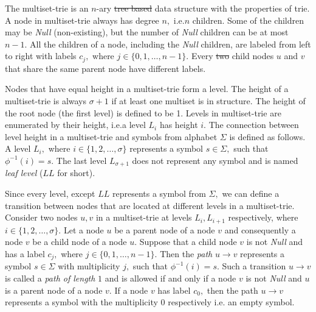 \documentclass[10pt,letterpaper]{article}
\providecommand{\DIFaddtex}[1]{{\protect\color{blue}\uwave{#1}}} %
\providecommand{\DIFdeltex}[1]{{\protect\color{red}\sout{#1}}}                      %
\providecommand{\DIFaddbegin}{} %
\providecommand{\DIFaddend}{} %
\providecommand{\DIFdelbegin}{} %
\providecommand{\DIFdelend}{} %
\providecommand{\DIFadd}[1]{\texorpdfstring{\DIFaddtex{#1}}{#1}} %
\providecommand{\DIFdel}[1]{\texorpdfstring{\DIFdeltex{#1}}{}} %
\newcommand{\DIFscaledelfig}{0.5}
\newlength{\DIFdelgraphicswidth} %
\newlength{\DIFdelgraphicsheight} %
\newcommand{\DIFaddincludegraphics}[2][]{{\color{blue}\fbox{\DIFOincludegraphics[#1]{#2}}}} %
\newcommand{\DIFdelincludegraphics}[2][]{%
\sbox{\DIFdelgraphicsbox}{\DIFOincludegraphics[#1]{#2}}%
\settoboxwidth{\DIFdelgraphicswidth}{\DIFdelgraphicsbox} %
\settoboxtotalheight{\DIFdelgraphicsheight}{\DIFdelgraphicsbox} %
\scalebox{\DIFscaledelfig}{%
\parbox[b]{\DIFdelgraphicswidth}{\usebox{\DIFdelgraphicsbox}\\[-\baselineskip] \rule{\DIFdelgraphicswidth}{0em}}\llap{\resizebox{\DIFdelgraphicswidth}{\DIFdelgraphicsheight}{%
\setlength{\unitlength}{\DIFdelgraphicswidth}%
\begin{picture}(1,1)%
\thicklines\linethickness{2pt} %
{\color[rgb]{1,0,0}\put(0,0){\framebox(1,1){}}}%
{\color[rgb]{1,0,0}\put(0,0){\line( 1,1){1}}}%
{\color[rgb]{1,0,0}\put(0,1){\line(1,-1){1}}}%
\end{picture}%
}\hspace*{3pt}}} %
} %
\DeclareRobustCommand{\DIFaddbegin}{\DIFOaddbegin \let\includegraphics\DIFaddincludegraphics} %
\DeclareRobustCommand{\DIFaddend}{\DIFOaddend \let\includegraphics\DIFOincludegraphics} %
\DeclareRobustCommand{\DIFdelbegin}{\DIFOdelbegin \let\includegraphics\DIFdelincludegraphics} %
\DeclareRobustCommand{\DIFdelend}{\DIFOaddend \let\includegraphics\DIFOincludegraphics} %
\begin{document}
The multiset-trie is an $n$-ary \DIFdelbegin \DIFdel{tree based }\DIFdelend \DIFaddbegin \DIFadd{tree-based }\DIFaddend data structure with the properties of 
\DIFaddbegin \DIFadd{the }\DIFaddend trie. A node in multiset-trie always has degree $n,$ i.e.\DIFaddbegin \DIFadd{, }\DIFaddend $n$ children. Some of 
the children may be \emph{Null} (non-existing), but the number of \emph{Null} 
children can be at most $n-1.$ All the children of a node, including the \emph{Null} 
children, are labeled from left to right with labels $c_j,$ where $j\in \{ 0, 1, \ldots, n-1 \}.$ 
Every \DIFdelbegin \DIFdel{two }\DIFdelend \DIFaddbegin \DIFadd{pair of }\DIFaddend child nodes $u$ and $v$ that share the same parent node have different labels.


Nodes that have equal height in a multiset-trie form a level. The height of a 
multiset-trie is always $\sigma+1$ if at least one multiset is in structure. 
The height of the root node (the first level) is defined to be 1.
%
Levels in multiset-trie are enumerated by their height, i.e.\DIFaddbegin \DIFadd{, }\DIFaddend a level $L_i$ has 
height $i.$ The connection between level height in a multiset-trie and symbols 
from alphabet $\Sigma$ is defined as follows. A level $L_i,$ where 
$i\in\{ 1,2,\ldots, \sigma \}$ represents a symbol $s\in\Sigma,$ such that 
$\phi^{-1}(i) = s.$ The last level $L_{\sigma+1}$ does not represent any symbol 
and is named \emph{leaf level} ($LL$ for short).

Since every level, except $LL$ represents a symbol from $\Sigma,$ we can define 
a transition between nodes that are located at different levels in a multiset-trie. 
%
Consider two nodes $u,v$ in a multiset-trie at levels $L_i, L_{i+1}$ respectively, 
where $i\in\{1,2,\ldots,\sigma\}.$ Let a node $u$ be a parent node of a node $v$ 
and consequently a node $v$ be a child node of a node $u.$ Suppose that a child 
node $v$ is not \emph{Null} and has a label $c_j,$ where $j\in\{ 0,1,\ldots, n-1 \}.$ 
%
Then the \emph{path} $u\rightarrow v$ represents a symbol $s\in\Sigma$ with 
multiplicity $j,$ such that $\phi^{-1}(i) = s.$ 
%
Such a transition $u\rightarrow v$ is called a \emph{path of length} $1$ and is 
allowed if and only if a node $v$ is not \emph{Null} and $u$ is a parent node of 
a node $v.$ If a node $v$ has label $c_0,$ then the path $u\rightarrow v$ 
represents a symbol with the multiplicity $0$ respectively i.e. an empty symbol.
\end{document}
